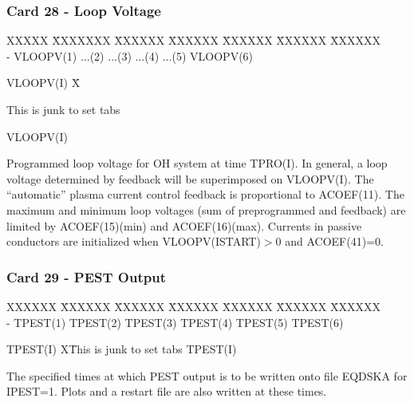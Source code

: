 \newpage \subsubsection{Card 28 - Loop Voltage}
\begin{tabbing}
XXXXX \= XXXXXXX \= XXXXXX \= XXXXXX \= XXXXXX \= XXXXXX \= XXXXXX       \\
\footnotesize  - \>\footnotesize VLOOPV(1)  \>\footnotesize $\ldots$(2) \>\footnotesize  $\ldots$(3) \>\footnotesize $\ldots$(4) \>\footnotesize $\ldots$(5) \>\footnotesize
VLOOPV(6)
\end{tabbing}
\begin{tabbing}
VLOOPV(I) X\= \parbox[t]{\width}{This is junk to set tabs} \kill
VLOOPV(I) \> \parbox[t]{\width}{Programmed loop voltage for OH system at time TPRO(I). 
In
general, a loop voltage determined by feedback will be superimposed on VLOOPV(I).  The
``automatic'' plasma current control feedback is proportional to ACOEF(11). The maximum and
minimum loop voltages (sum of preprogrammed and feedback) are limited by ACOEF(15)(min)
and ACOEF(16)(max).  Currents in passive conductors are initialized when
VLOOPV(ISTART)$>$0 and ACOEF(41)=0.}
\end{tabbing}
\newpage \subsubsection{Card 29 - PEST Output}
\begin{tabbing}
XXXXXX \= XXXXXX \= XXXXXX \= XXXXXX \= XXXXXX \= XXXXXX \=
XXXXXX       \\
\footnotesize  - \>\footnotesize TPEST(1)  \>\footnotesize TPEST(2) \>\footnotesize TPEST(3)
\>\footnotesize TPEST(4) \>\footnotesize TPEST(5) \>\footnotesize TPEST(6)
\end{tabbing}
\begin{tabbing}
TPEST(I) X\= This is junk to set tabs \kill
TPEST(I) \> \parbox[t]{\width}{The specified times at which PEST output is to be written onto
file EQDSKA for IPEST=1. Plots and a restart file are also written at these times.}
\end{tabbing}


